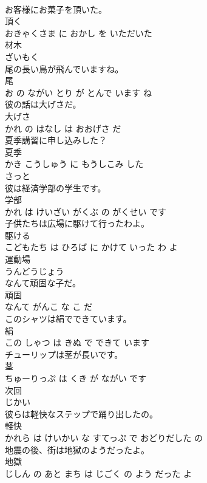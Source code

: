 \documentclass[8pt]{extreport}
\begin{document}
\begin{CJK}{UTF8}{min}
\\	お客様にお菓子を頂いた。	
\\	頂く 
\\	おきゃくさま に おかし を いただいた			
\\	材木	
\\	ざいもく			
\\	尾の長い鳥が飛んでいますね。	
\\	尾 
\\	お の ながい とり が とんで います ね			
\\	彼の話は大げさだ。	
\\	大げさ 
\\	かれ の はなし は おおげさ だ			
\\	夏季講習に申し込みした？	
\\	夏季 
\\	かき こうしゅう に もうしこみ した 
\\	さっと	
\\	彼は経済学部の学生です。	
\\	学部 
\\	かれ は けいざい がくぶ の がくせい です			
\\	子供たちは広場に駆けて行ったわよ。	
\\	駆ける 
\\	こどもたち は ひろば に かけて いった わ よ			
\\	運動場	
\\	うんどうじょう			
\\	なんて頑固な子だ。	
\\	頑固 
\\	なんて がんこ な こ だ			
\\	このシャツは絹でできています。	
\\	絹 
\\	この しゃつ は きぬ で できて います			
\\	チューリップは茎が長いです。	
\\	茎 
\\	ちゅーりっぷ は くき が ながい です			
\\	次回	
\\	じかい			
\\	彼らは軽快なステップで踊り出したの。	
\\	軽快 
\\	かれら は けいかい な すてっぷ で おどりだした の			
\\	地震の後、街は地獄のようだったよ。	
\\	地獄 
\\	じしん の あと まち は じごく の よう だった よ			

\end{CJK}
\end{document}
